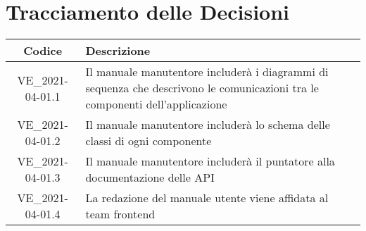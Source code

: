 \section*{Tracciamento delle Decisioni}

\begin{center}
	\begin{longtable}{|c|p{13cm}|}
	\hline
	\rowcolor{lighter-grayer}
	\textbf{Codice} & \textbf{Descrizione} \\
	\hline
	\endfirsthead
	\hline
	VE\_2021-04-01.1 & Il manuale manutentore includerà i diagrammi di sequenza che descrivono le comunicazioni tra le componenti dell'applicazione \\
	VE\_2021-04-01.2 & Il manuale manutentore includerà lo schema delle classi di ogni componente \\
	VE\_2021-04-01.3 & Il manuale manutentore includerà il puntatore alla documentazione delle API \\
	VE\_2021-04-01.4 & La redazione del manuale utente viene affidata al team frontend \\
	\hline

	\end{longtable}
\end{center}
